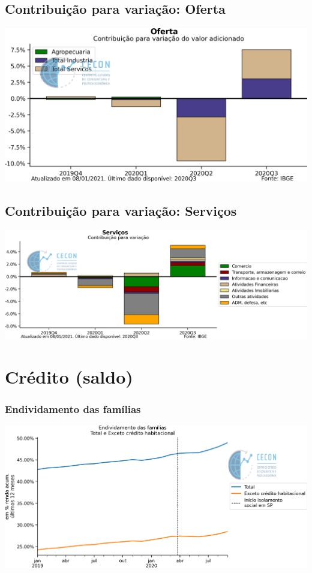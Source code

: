 \documentclass{SelfArx}
\begin{document}
\subsection*{Contribuição para variação: Oferta}
\label{sec:org91f2af5}

\begin{center}
\includegraphics[width=.9\linewidth]{./figs/PIB/Contrib_Oferta.png}
\end{center}


\subsection*{Contribuição para variação: Serviços}
\label{sec:org695567b}

\begin{center}
\includegraphics[width=.9\linewidth]{./figs/PIB/Contrib_Servicos.png}
\end{center}

\section*{Crédito (saldo)}
\label{sec:org44167ad}

\subsubsection*{Endividamento das famílias}
\label{sec:org78956c7}

\begin{center}
\includegraphics[width=.9\linewidth]{./figs/Credito/EndividamentoFamilias.png}
\end{center}
\end{document}

